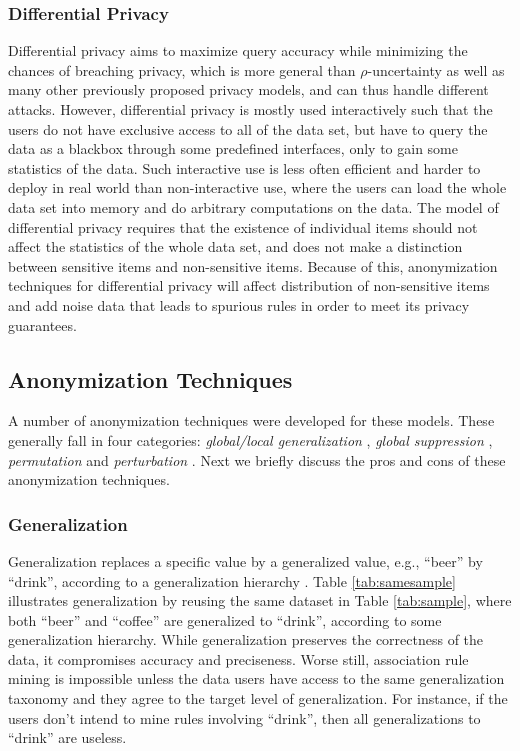 \subsubsection{Differential Privacy}

Differential privacy \cite{Dwork08:diff:survey} aims to maximize query 
accuracy while minimizing the chances of breaching privacy, 
which is more general than $\rho$-uncertainty as well as many other
previously proposed privacy models, and can thus handle different attacks.  
However, differential privacy is mostly used
interactively such that the users do not have exclusive access to
all of the data set, but have to query the data as a blackbox through some
predefined interfaces, only to gain some statistics of the data.  
Such interactive use is less often efficient and harder to
deploy in real world than non-interactive use, 
where the users can load the whole data set into
memory and do arbitrary computations on the data.  
The model of differential privacy requires that the existence of individual items
should not affect the statistics of the whole data set, and does not make a
distinction between sensitive items and non-sensitive items.  Because of this,
anonymization techniques for differential privacy will affect distribution of
non-sensitive items and add noise data that leads to spurious rules
in order to meet its privacy guarantees.

\subsection{Anonymization Techniques}

A number of anonymization techniques
were developed for these models. 
These generally fall in four categories: {\em
global/local generalization} 
\cite{Terrovitis:2008:PAS,He:2009:ASD,Cao:2010:rho}, {\em global suppression} \cite{Xu:2008:ATD,Cao:2010:rho},
{\em permutation} \cite{2011:TKDE:Anonymous} and {\em perturbation}
\cite{Zhang:2007:agg,ChenMFDX11:Diff}. Next we briefly discuss the pros and
cons of these anonymization techniques.

\subsubsection{Generalization}

Generalization replaces a specific value by
a generalized value, e.g., ``beer'' by ``drink'',
according to a generalization hierarchy \cite{FungWCY10:Survey}.
Table \ref{tab:samesample} illustrates generalization by reusing the
same dataset in Table \ref{tab:sample}, where both ``beer'' and ``coffee''
are generalized to ``drink'', according to some generalization hierarchy.
While generalization preserves the correctness of the data,
it compromises accuracy
and preciseness. Worse still, association rule mining is impossible
unless the data users have access to the same generalization taxonomy
and they agree to the target level of generalization. For instance, if
the users don't intend to mine rules involving ``drink'', then
all generalizations to ``drink'' are useless.

